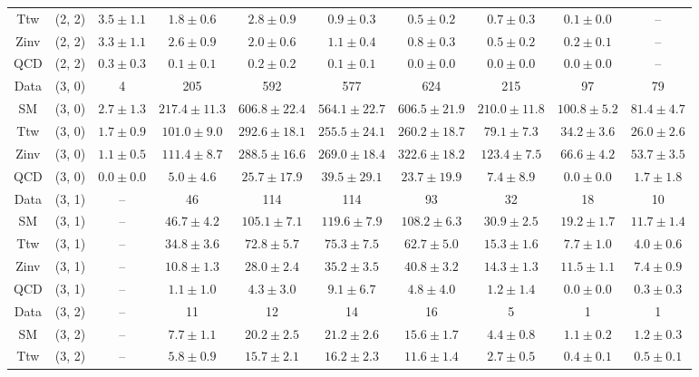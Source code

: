 \begin{table}[h!]
{\begin{tabular}{cccccccccc}
	Ttw & (2, 2) & $3.5\pm 1.1$ & $1.8\pm 0.6$ & $2.8\pm 0.9$ & $0.9\pm 0.3$ & $0.5\pm 0.2$ & $0.7\pm 0.3$ & $0.1\pm 0.0$ & -- \\[0.5ex] 
	Zinv & (2, 2) & $3.3\pm 1.1$ & $2.6\pm 0.9$ & $2.0\pm 0.6$ & $1.1\pm 0.4$ & $0.8\pm 0.3$ & $0.5\pm 0.2$ & $0.2\pm 0.1$ & -- \\[0.5ex] 
	QCD & (2, 2) & $0.3\pm 0.3$ & $0.1\pm 0.1$ & $0.2\pm 0.2$ & $0.1\pm 0.1$ & $0.0\pm 0.0$ & $0.0\pm 0.0$ & $0.0\pm 0.0$ & -- \\[0.5ex] 
	Data & (3, 0) & 4 & 205 & 592 & 577 & 624 & 215 & 97 & 79 \\[0.5ex] 
	SM & (3, 0) & $2.7\pm 1.3$ & $217.4\pm 11.3$ & $606.8\pm 22.4$ & $564.1\pm 22.7$ & $606.5\pm 21.9$ & $210.0\pm 11.8$ & $100.8\pm 5.2$ & $81.4\pm 4.7$ \\[0.5ex] 
	Ttw & (3, 0) & $1.7\pm 0.9$ & $101.0\pm 9.0$ & $292.6\pm 18.1$ & $255.5\pm 24.1$ & $260.2\pm 18.7$ & $79.1\pm 7.3$ & $34.2\pm 3.6$ & $26.0\pm 2.6$ \\[0.5ex] 
	Zinv & (3, 0) & $1.1\pm 0.5$ & $111.4\pm 8.7$ & $288.5\pm 16.6$ & $269.0\pm 18.4$ & $322.6\pm 18.2$ & $123.4\pm 7.5$ & $66.6\pm 4.2$ & $53.7\pm 3.5$ \\[0.5ex] 
	QCD & (3, 0) & $0.0\pm 0.0$ & $5.0\pm 4.6$ & $25.7\pm 17.9$ & $39.5\pm 29.1$ & $23.7\pm 19.9$ & $7.4\pm 8.9$ & $0.0\pm 0.0$ & $1.7\pm 1.8$ \\[0.5ex] 
	Data & (3, 1) & -- & 46 & 114 & 114 & 93 & 32 & 18 & 10 \\[0.5ex] 
	SM & (3, 1) & -- & $46.7\pm 4.2$ & $105.1\pm 7.1$ & $119.6\pm 7.9$ & $108.2\pm 6.3$ & $30.9\pm 2.5$ & $19.2\pm 1.7$ & $11.7\pm 1.4$ \\[0.5ex] 
	Ttw & (3, 1) & -- & $34.8\pm 3.6$ & $72.8\pm 5.7$ & $75.3\pm 7.5$ & $62.7\pm 5.0$ & $15.3\pm 1.6$ & $7.7\pm 1.0$ & $4.0\pm 0.6$ \\[0.5ex] 
	Zinv & (3, 1) & -- & $10.8\pm 1.3$ & $28.0\pm 2.4$ & $35.2\pm 3.5$ & $40.8\pm 3.2$ & $14.3\pm 1.3$ & $11.5\pm 1.1$ & $7.4\pm 0.9$ \\[0.5ex] 
	QCD & (3, 1) & -- & $1.1\pm 1.0$ & $4.3\pm 3.0$ & $9.1\pm 6.7$ & $4.8\pm 4.0$ & $1.2\pm 1.4$ & $0.0\pm 0.0$ & $0.3\pm 0.3$ \\[0.5ex] 
	Data & (3, 2) & -- & 11 & 12 & 14 & 16 & 5 & 1 & 1 \\[0.5ex] 
	SM & (3, 2) & -- & $7.7\pm 1.1$ & $20.2\pm 2.5$ & $21.2\pm 2.6$ & $15.6\pm 1.7$ & $4.4\pm 0.8$ & $1.1\pm 0.2$ & $1.2\pm 0.3$ \\[0.5ex] 
	Ttw & (3, 2) & -- & $5.8\pm 0.9$ & $15.7\pm 2.1$ & $16.2\pm 2.3$ & $11.6\pm 1.4$ & $2.7\pm 0.5$ & $0.4\pm 0.1$ & $0.5\pm 0.1$ \\[0.5ex] 

\end{tabular}}
\end{table}
